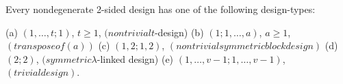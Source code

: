 Every nondegenerate 2-sided design has one of the following design-types:

(a) $(1, \ldots, t; 1)$, $t \geq 1$, $(nontrivial t$-design)
(b) $(1; 1, \ldots, a)$, $a \geq 1$, $(transpose of (a))$
(c) $(1, 2; 1, 2)$, $(nontrivial symmetric block design)$
(d) $(2; 2)$, $(symmetric \lambda$-linked design)
(e) $(1, \ldots, v - 1; 1, \ldots, v - 1)$, $(trivial design)$.
